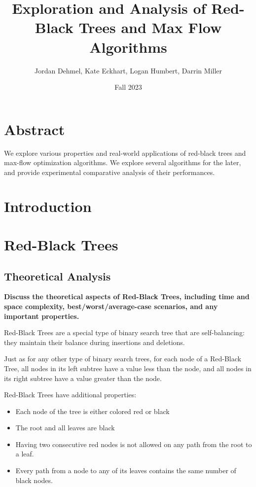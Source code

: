 \documentclass[12pt]{amsart}
\title{Exploration and Analysis of Red-Black Trees and Max Flow
    Algorithms}
\author{Jordan Dehmel, Kate Eckhart, Logan Humbert, Darrin Miller}
\date{Fall 2023}
\begin{document}
\maketitle

\tableofcontents

\section{Abstract}

    We explore various properties and real-world applications of
    red-black trees and max-flow optimization algorithms. We
    explore several algorithms for the later, and provide
    experimental comparative analysis of their performances.

\section{Introduction}

\section{Red-Black Trees}

\subsection{Theoretical Analysis}

    \textbf{Discuss the theoretical aspects of Red-Black Trees, including time and space
	complexity, best/worst/average-case scenarios, and any important properties.}
	
	Red-Black Trees are a special type of binary search tree that are self-balancing: they maintain their balance
    during insertions and deletions.
    
    Just as for any other type of binary search trees, for each node of a Red-Black Tree, all nodes in its left subtree have a value less than the node, and all nodes in its right subtree have a value greater than the node.
    
    Red-Black Trees have additional properties:
    
    \begin{itemize}
    	\item Each node of the tree is either colored red or black
    	\item The root and all leaves are black
    	\item Having two consecutive red nodes is not allowed on any path from the root to a leaf.
    	\item Every path from a node to any of its leaves contains the same number of black nodes.
    \end{itemize}
    
\end{document}
